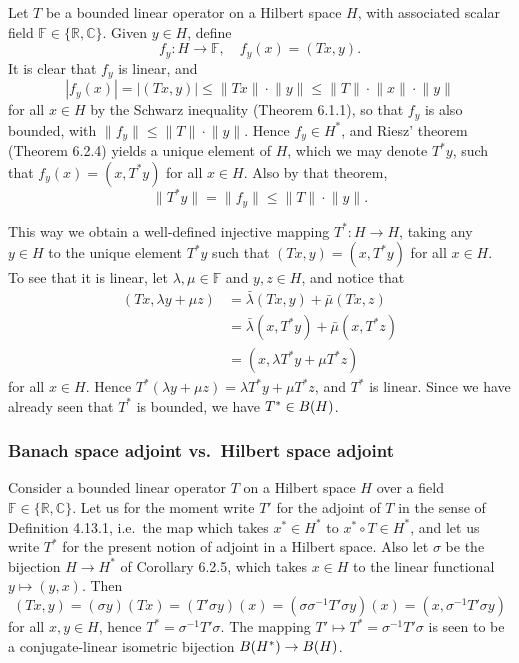 \documentclass{report}
\newcommand{\bb}[1]{\mathbb{#1}}
\newcommand{\norm}[1]{{\lVert #1 \rVert}}
\let\sc\relax
\newcommand{\sc}[1]{\mathscr{#1}}
\theoremstyle{remark}
\begin{document}
Let $T$ be a bounded linear operator on a Hilbert space $H$, with associated scalar field $\bb F \in \{\bb R, \bb C\}$. Given $y \in H$, define
\begin{equation*}
  f_y: H \to \bb F, \quad f_y(x) = (Tx, y).
\end{equation*}
It is clear that $f_y$ is linear, and
\begin{equation*}
  |f_y(x)| = |(Tx,y)| \le \norm{Tx} \cdot \norm{y} \le \norm T \cdot \norm x \cdot \norm y
\end{equation*}
for all $x \in H$ by the Schwarz inequality (Theorem 6.1.1), so that $f_y$ is also bounded, with $\norm{f_y} \le \norm T \cdot \norm y$. Hence $f_y \in H^*$, and Riesz' theorem (Theorem 6.2.4) yields a unique element of $H$, which we may denote $T^* y$, such that $f_y(x) = (x,T^*y)$ for all $x \in H$. Also by that theorem,
\begin{equation*}
  \norm{T^*y} = \norm{f_y} \le \norm T \cdot \norm y.
\end{equation*}

This way we obtain a well-defined injective mapping $T^*: H \to H$, taking any $y \in H$ to the unique element $T^*y$ such that $(Tx,y) = (x, T^*y)$ for all $x \in H$. To see that it is linear, let $\lambda, \mu \in \bb F$ and $y,z \in H$, and notice that
\begin{equation*}
  \begin{split}
    (Tx, \lambda y + \mu z) &= \bar \lambda (Tx, y) + \bar \mu (Tx, z) \\
    &= \bar \lambda (x, T^*y) + \bar \mu (x, T^*z) \\
    &= (x, \lambda T^* y + \mu T^* z)
  \end{split}
\end{equation*}
for all $x \in H$. Hence $T^*(\lambda y + \mu z) = \lambda T^* y + \mu T^* z$, and $T^*$ is linear. Since we have already seen that $T^*$ is bounded, we have $T^* \in \sc B(H)$.

\subsubsection*{Banach space adjoint vs.\ Hilbert space adjoint}
Consider a bounded linear operator $T$ on a Hilbert space $H$ over a field $\bb F \in \{\bb R, \bb C\}$. Let us for the moment write $T'$ for the adjoint of $T$ in the sense of Definition 4.13.1, i.e.\ the map which takes $x^* \in H^*$ to $x^* \circ T \in H^*$, and let us write $T^*$ for the present notion of adjoint in a Hilbert space. Also let $\sigma$ be the bijection $H \to H^*$ of Corollary 6.2.5, which takes $x \in H$ to the linear functional $y \mapsto (y,x)$. Then
\begin{equation*}
  (Tx, y) = (\sigma y)(Tx) = (T'\sigma y)(x) = (\sigma \sigma^{-1} T' \sigma y)(x) = (x, \sigma^{-1} T' \sigma y)
\end{equation*}
for all $x,y \in H$, hence $T^* = \sigma^{-1} T' \sigma$. The mapping $T' \mapsto T^* = \sigma^{-1} T' \sigma$ is seen to be a conjugate-linear isometric bijection $\sc B(H^*) \to \sc B(H)$.
\end{document}
